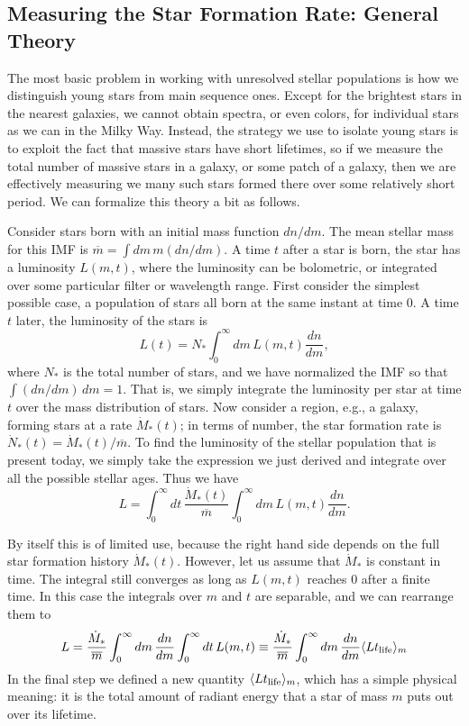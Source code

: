 \subsection{Measuring the Star Formation Rate: General Theory}

The most basic problem in working with unresolved stellar populations is how we distinguish young stars from main sequence ones. Except for the brightest stars in the nearest galaxies, we cannot obtain spectra, or even colors, for individual stars as we can in the Milky Way. Instead, the strategy we use to isolate young stars is to exploit the fact that massive stars have short lifetimes, so if we measure the total number of massive stars in a galaxy, or some patch of a galaxy, then we are effectively measuring we many such stars formed there over some relatively short period. We can formalize this theory a bit as follows.

Consider stars born with an initial mass function $dn/dm$. The mean stellar mass for this IMF is $\overline{m} = \int dm\, m(dn/dm)$. A time $t$ after a star is born, the star has a luminosity $L(m,t)$, where the luminosity can be bolometric, or integrated over some particular filter or wavelength range. First consider the simplest possible case, a population of stars all born at the same instant at time $0$. A time $t$ later, the luminosity of the stars is
\begin{equation}
L(t) = N_* \int_0^{\infty} dm\, L(m,t) \frac{dn}{dm},
\end{equation}
where $N_*$ is the total number of stars, and we have normalized the IMF so that $\int (dn/dm) \, dm = 1$. That is, we simply integrate the luminosity per star at time $t$ over the mass distribution of stars. Now consider a region, e.g., a galaxy, forming stars at a rate $\dot{M}_*(t)$; in terms of number, the star formation rate is $\dot{N}_*(t) = \dot{M}_*(t)/\overline{m}$. To find the luminosity of the stellar population that is present today, we simply take the expression we just derived and integrate over all the possible stellar ages. Thus we have
\begin{equation}
L =  \int_{0}^\infty dt\, \frac{\dot{M}_*(t)}{\overline{m}}  \int_0^{\infty} dm\, L(m,t) \frac{dn}{dm}.
\end{equation}

By itself this is of limited use, because the right hand side depends on the full star formation history $\dot{M}_*(t)$. However, let us assume that $\dot{M}_*$ is constant in time. The integral still converges as long as $L(m,t)$ reaches 0 after a finite time. In this case the integrals over $m$ and $t$ are separable, and we can rearrange them to
\begin{equation}
\label{eq:sfrtol}
L = \frac{\dot{M}_*}{\overline{m}} \int_0^{\infty} dm \, \frac{dn}{dm} \int_0^\infty dt \, L(m,t) \equiv \frac{\dot{M}_*}{\overline{m}} \int_0^{\infty} dm \, \frac{dn}{dm} \langle L t_{\rm life} \rangle_m 
\end{equation}
In the final step we defined a new quantity $\langle L t_{\rm life} \rangle_m$, which has a simple physical meaning: it is the total amount of radiant energy that a star of mass $m$ puts out over its lifetime.

